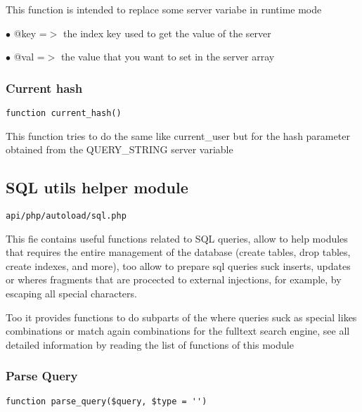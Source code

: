 \documentclass[a4paper]{article}
\begin{document}
This function is intended to replace some server variabe in runtime mode

\begin{compactitem}
\item[\color{myblue}$\bullet$] @key =$>$ the index key used to get the value of the server
\item[\color{myblue}$\bullet$] @val =$>$ the value that you want to set in the server array
\end{compactitem}

\hypertarget{toc212}{}
\subsubsection{Current hash}

\begin{lstlisting}
function current_hash()
\end{lstlisting}

This function tries to do the same like current\_user but for the hash parameter
obtained from the QUERY\_STRING server variable

\hypertarget{toc213}{}
\subsection{SQL utils helper module}

\begin{lstlisting}
api/php/autoload/sql.php
\end{lstlisting}

This fie contains useful functions related to SQL queries, allow to help modules that requires
the entire management of the database (create tables, drop tables, create indexes, and more),
too allow to prepare sql queries suck inserts, updates or wheres fragments that are procected
to external injections, for example, by escaping all special characters.

Too it provides functions to do subparts of the where queries suck as special likes combinations
or match again combinations for the fulltext search engine, see all detailed information by
reading the list of functions of this module

\hypertarget{toc214}{}
\subsubsection{Parse Query}

\begin{lstlisting}
function parse_query($query, $type = '')
\end{lstlisting}
\end{document}
